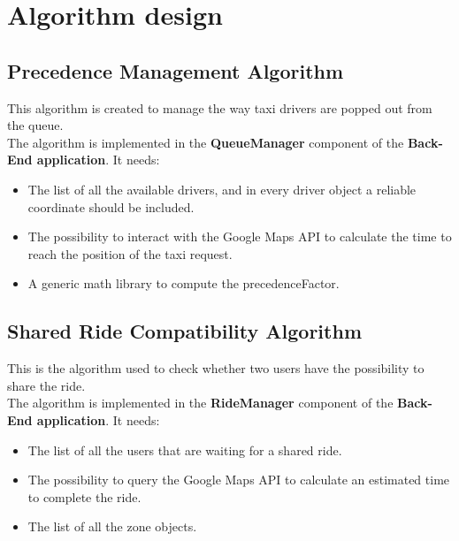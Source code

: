 

\section{Algorithm design} %
\label{sec:algorithm_design}


\subsection{Precedence Management Algorithm} %
\label{sub:first_algorithm}
This algorithm is created to manage the way taxi drivers are popped out from the queue.\\
The algorithm is implemented in the \textbf{QueueManager} component of the \textbf{Back-End application}.
It needs:

\begin{itemize}
	\item The list of all the available drivers, and in every driver object a reliable coordinate should be included.
	\item The possibility to interact with the Google Maps API to calculate the time to reach the position of the taxi request.
	\item A generic math library to compute the precedenceFactor.
\end{itemize}







\subsection{Shared Ride Compatibility Algorithm} %
\label{sub:second_algorithm}
This is the algorithm used to check whether two users have the possibility to share the ride.\\
The algorithm is implemented in the \textbf{RideManager} component of the \textbf{Back-End application}.
It needs:
\begin{itemize}
	\item The list of all the users that are waiting for a shared ride.
	\item The possibility to query the Google Maps API to calculate an estimated time to complete the ride.
	\item The list of all the zone objects.
\end{itemize}

